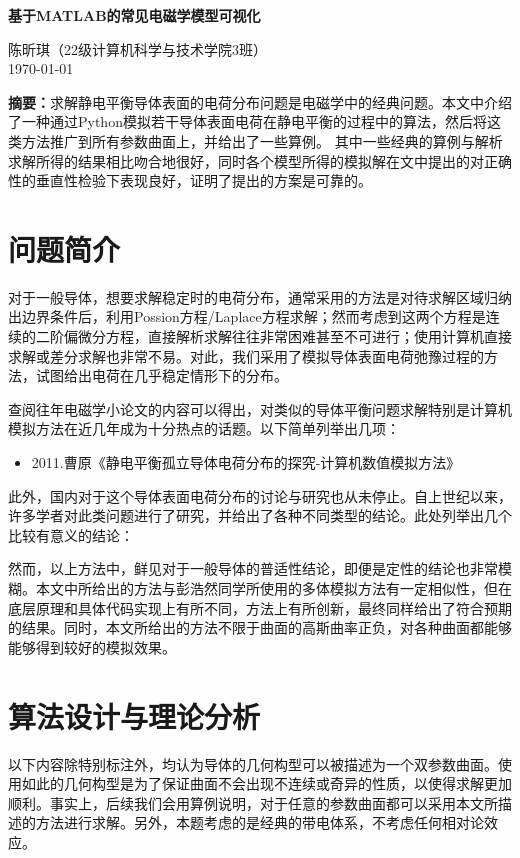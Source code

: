 \documentclass[UTF8]{article}
\numberwithin{figure}{subsection}
\numberwithin{table}{subsection}
\begin{document}
\begin{center}
    \LARGE{\textbf{基于MATLAB的常见电磁学模型可视化}}

    \vspace*{0.2cm}
    \normalsize{陈昕琪（22级计算机科学与技术学院3班）\qquad \\ \today}
\end{center}
\normalsize
\noindent \textbf{摘要：}求解静电平衡导体表面的电荷分布问题是电磁学中的经典问题。本文中介绍了一种通过Python模拟若干导体表面电荷在静电平衡的过程中的算法，然后将这类方法推广到所有参数曲面上，并给出了一些算例。
其中一些经典的算例与解析求解所得的结果相比吻合地很好，同时各个模型所得的模拟解在文中提出的对正确性的垂直性检验下表现良好，证明了提出的方案是可靠的。
\begin{multicols}{2}
    \section{问题简介}
    \par 对于一般导体，想要求解稳定时的电荷分布，通常采用的方法是对待求解区域归纳出边界条件后，利用Possion方程/Laplace方程求解；然而考虑到这两个方程是连续的二阶偏微分方程，直接解析求解往往非常困难甚至不可进行；使用计算机直接求解或差分求解也非常不易。对此，我们采用了模拟导体表面电荷弛豫过程的方法，试图给出电荷在几乎稳定情形下的分布。
    \par 查阅往年电磁学小论文的内容可以得出，对类似的导体平衡问题求解特别是计算机模拟方法在近几年成为十分热点的话题。以下简单列举出几项：
    \begin{itemize}
        \item 2011.曹原《静电平衡孤立导体电荷分布的探究-计算机数值模拟方法》
    \end{itemize}
    \par 此外，国内对于这个导体表面电荷分布的讨论与研究也从未停止。自上世纪以来，许多学者对此类问题进行了研究，并给出了各种不同类型的结论。此处列举出几个比较有意义的结论：
    \par 然而，以上方法中，鲜见对于一般导体的普适性结论，即便是定性的结论也非常模糊。本文中所给出的方法与彭浩然同学所使用的多体模拟方法有一定相似性，但在底层原理和具体代码实现上有所不同，方法上有所创新，最终同样给出了符合预期的结果。同时，本文所给出的方法不限于曲面的高斯曲率正负，对各种曲面都能够能够得到较好的模拟效果。

    \section{算法设计与理论分析}
    \par 以下内容除特别标注外，均认为导体的几何构型可以被描述为一个双参数曲面。使用如此的几何构型是为了保证曲面不会出现不连续或奇异的性质，以使得求解更加顺利。事实上，后续我们会用算例说明，对于任意的参数曲面都可以采用本文所描述的方法进行求解。另外，本题考虑的是经典的带电体系，不考虑任何相对论效应。

\end{multicols}
\end{document}
